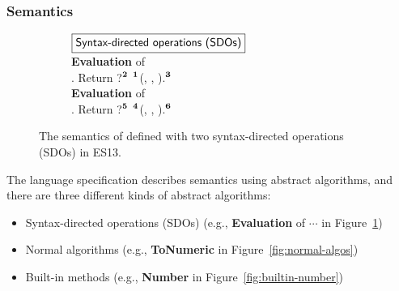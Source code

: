 \subsubsection{Semantics}\label{sec:sem}

\begin{figure}
  \centering
  \begin{subfigure}{\textwidth}
    \small
    $\fbox{\textsf{Syntax-directed operations (SDOs)}}$
    \vspace*{0.5em}\\
    \textbf{Evaluation} of
     \est{:}  \est{+}
    \\
    \null{}. Return ?${}^{\textbf{2}}$
    ${}^{\textbf{1}}$(,
    \escode{+}, ).${}^{\textbf{3}}$
    \vspace*{0.5em}\\
    \textbf{Evaluation} of
     \est{:}  \est{-}
    \\
    \null{}. Return ?${}^{\textbf{5}}$
    ${}^{\textbf{4}}$(,
    \escode{-}, ).${}^{\textbf{6}}$

  \end{subfigure}
  \caption{
    The semantics of  defined with two syntax-directed
    operations (SDOs) in ES13.
  }
  \label{fig:add-sdo}
\end{figure}

The language specification describes semantics using abstract algorithms, and
there are three different kinds of abstract algorithms:
%
\begin{itemize}
  \item Syntax-directed operations (SDOs) (e.g., \textbf{Evaluation} of
     \est{:} $\cdots$ in Figure~\ref{fig:add-sdo})

  \item Normal algorithms (e.g., \textbf{ToNumeric} in
    Figure~\ref{fig:normal-algos})

  \item Built-in methods (e.g., \textbf{Number} in
    Figure~\ref{fig:builtin-number})
\end{itemize}

